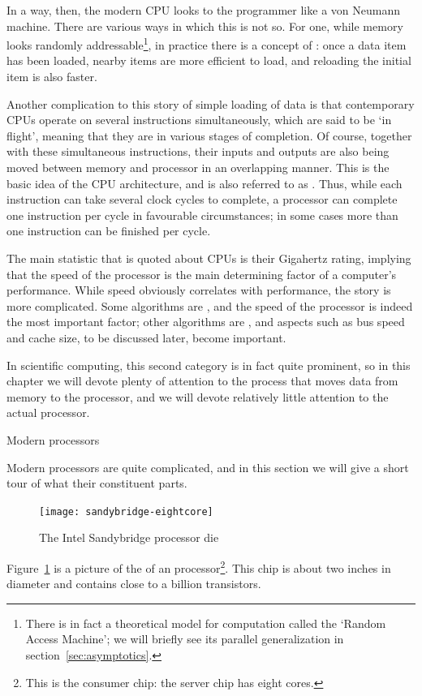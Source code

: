 In a way, then, the modern CPU looks to the programmer like a von
Neumann machine. There are various ways in which this is not so. For
one, while memory looks randomly addressable\footnote{There is in fact
  a theoretical model for computation called the `Random Access
  Machine'; we will briefly see its parallel generalization in
  section~\ref{sec:asymptotics}.}, in practice there is a concept of
: once a data item has been loaded, nearby items
are more efficient to load, and reloading the initial item is also faster.

Another complication to this story of simple loading of data is that
contemporary CPUs operate on several
instructions simultaneously, which are said to be `in flight', meaning
that they are in various stages of completion. 
Of course, together with these simultaneous instructions, their inputs
and outputs are also being moved between memory and processor in an
overlapping manner.
This is the basic idea
of the  CPU architecture, and is also referred
to as . Thus, while each
instruction can take several clock cycles to complete, a processor can
complete one instruction per cycle in favourable circumstances; in
some cases more than one instruction can be finished per cycle.
 
The main statistic that is quoted about CPUs is their 
Gigahertz rating, implying that the speed of the processor is the main
determining factor of a computer's performance. While speed obviously
correlates with performance, the story is more complicated. Some
algorithms are , and the speed of the processor
is indeed the most important factor; other algorithms are
, and aspects such as bus speed and cache
size, to be discussed later,
become important.

In scientific computing, this second category is in fact quite
prominent, so in this chapter we will devote plenty of attention to
the process that moves data from memory to the processor, and we will
devote relatively little attention to the actual processor.

 {Modern processors}
\label{sec:fp}

Modern processors are quite complicated, and in this section we will
give a short tour of what their constituent parts.
\begin{figure}[ht]
  \texttt{[image: sandybridge-eightcore]}
  \caption{The Intel Sandybridge processor die}
  \label{fig:sandybridge}
\end{figure}
Figure~\ref{fig:sandybridge} is a picture of the 
of an  processor\footnote
{This is the consumer chip: the server chip has eight cores.}.
This chip is about two inches in diameter and contains close
to a billion transistors.

